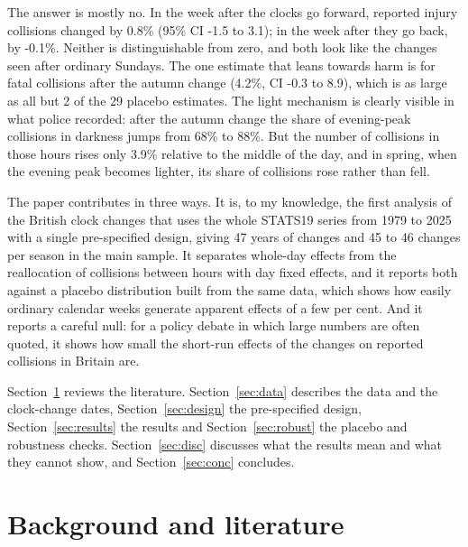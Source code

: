\documentclass[11pt,a4paper]{article}
\begin{document}
The answer is mostly no. In the week after the clocks go forward, reported injury collisions changed by 0.8\% (95\% CI -1.5 to 3.1); in the week after they go back, by -0.1\%. Neither is distinguishable from zero, and both look like the changes seen after ordinary Sundays. The one estimate that leans towards harm is for fatal collisions after the autumn change (4.2\%, CI -0.3 to 8.9), which is as large as all but 2 of the 29 placebo estimates. The light mechanism is clearly visible in what police recorded: after the autumn change the share of evening-peak collisions in darkness jumps from 68\% to 88\%. But the number of collisions in those hours rises only 3.9\% relative to the middle of the day, and in spring, when the evening peak becomes lighter, its share of collisions rose rather than fell.

The paper contributes in three ways. It is, to my knowledge, the first analysis of the British clock changes that uses the whole STATS19 series from 1979 to 2025 with a single pre-specified design, giving 47 years of changes and 45 to 46 changes per season in the main sample. It separates whole-day effects from the reallocation of collisions between hours with day fixed effects, and it reports both against a placebo distribution built from the same data, which shows how easily ordinary calendar weeks generate apparent effects of a few per cent. And it reports a careful null: for a policy debate in which large numbers are often quoted, it shows how small the short-run effects of the changes on reported collisions in Britain are.

Section~\ref{sec:lit} reviews the literature. Section~\ref{sec:data} describes the data and the clock-change dates, Section~\ref{sec:design} the pre-specified design, Section~\ref{sec:results} the results and Section~\ref{sec:robust} the placebo and robustness checks. Section~\ref{sec:disc} discusses what the results mean and what they cannot show, and Section~\ref{sec:conc} concludes.

\section{Background and literature}\label{sec:lit}
\end{document}
